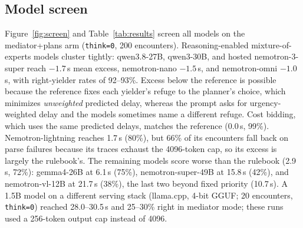 \documentclass[journal]{IEEEtran}
\begin{document}
\subsection{Model screen}
Figure~\ref{fig:screen} and Table~\ref{tab:results} screen all models on the mediator+plans arm (\texttt{think=0}, 200 encounters). Reasoning-enabled mixture-of-experts models cluster tightly: qwen3.8-27B, qwen3-30B, and hosted nemotron-3-super reach $-1.7$\,s mean excess, nemotron-nano $-1.5$\,s, and nemotron-omni $-1.0$\,s, with right-yielder rates of 92--93\%. Excess below the reference is possible because the reference fixes each yielder's refuge to the planner's choice, which minimizes \emph{unweighted} predicted delay, whereas the prompt asks for urgency-weighted delay and the models sometimes name a different refuge. Cost bidding, which uses the same predicted delays, matches the reference (0.0\,s, 99\%). Nemotron-lightning reaches 1.7\,s (80\%), but 66\% of its encounters fall back on parse failures because its traces exhaust the 4096-token cap, so its excess is largely the rulebook's. The remaining models score worse than the rulebook (2.9\,s, 72\%): gemma4-26B at 6.1\,s (75\%), nemotron-super-49B at 15.8\,s (42\%), and nemotron-vl-12B at 21.7\,s (38\%), the last two beyond fixed priority (10.7\,s). %
A 1.5B model on a different serving stack (llama.cpp, 4-bit GGUF; 20 encounters, \texttt{think=0}) reached 28.0--30.5\,s and 25--30\% right in mediator mode; these runs used a 256-token output cap instead of 4096.
\end{document}
